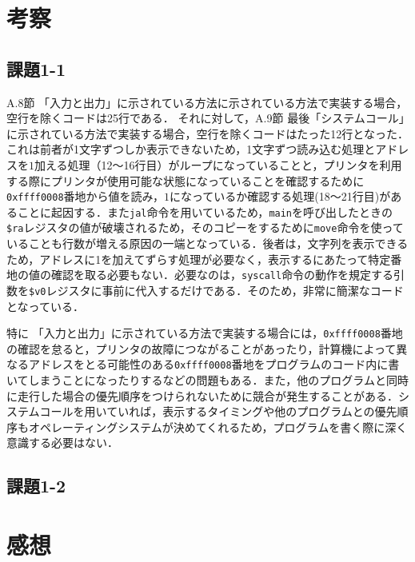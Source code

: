 \section{考察} \label{sec:review}

\subsection{課題1-1}
A.8節 「入力と出力」に示されている方法に示されている方法で実装する場合，空行を除くコードは25行である．
それに対して，A.9節 最後「システムコール」に示されている方法で実装する場合，空行を除くコードはたった12行となった．
これは前者が1文字ずつしか表示できないため，1文字ずつ読み込む処理とアドレスを$1$加える処理（12～16行目）がループになっていることと，プリンタを利用する際にプリンタが使用可能な状態になっていることを確認するために\verb|0xffff0008|番地から値を読み，$1$になっているか確認する処理(18～21行目)があることに起因する．また\verb|jal|命令を用いているため，\verb|main|を呼び出したときの\verb|$ra|レジスタの値が破壊されるため，そのコピーをするために\verb|move|命令を使っていることも行数が増える原因の一端となっている．後者は，文字列を表示できるため，アドレスに1を加えてずらす処理が必要なく，表示するにあたって特定番地の値の確認を取る必要もない．必要なのは，\verb|syscall|命令の動作を規定する引数を\verb|$v0|レジスタに事前に代入するだけである．そのため，非常に簡潔なコードとなっている．

特に 「入力と出力」に示されている方法で実装する場合には，\verb|0xffff0008|番地の確認を怠ると，プリンタの故障につながることがあったり，計算機によって異なるアドレスをとる可能性のある\verb|0xffff0008|番地をプログラムのコード内に書いてしまうことになったりするなどの問題もある．また，他のプログラムと同時に走行した場合の優先順序をつけられないために競合が発生することがある．システムコールを用いていれば，表示するタイミングや他のプログラムとの優先順序もオペレーティングシステムが決めてくれるため，プログラムを書く際に深く意識する必要はない．

\subsection{課題1-2}


\section{感想} \label{sec:review}


